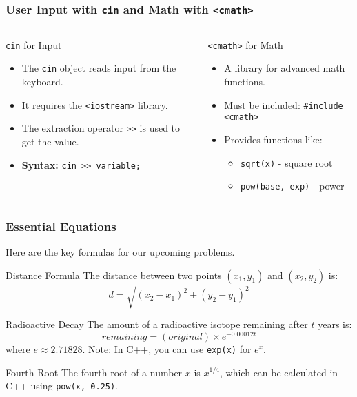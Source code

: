 \documentclass{beamer}
\begin{document}
\begin{frame}
\frametitle{User Input with \texttt{cin} and Math with \texttt{<cmath>}}
\begin{columns}[T]
    \begin{column}{0.5\textwidth}
        \begin{block}{\texttt{cin} for Input}
            \begin{itemize}
                \item The \texttt{cin} object reads input from the keyboard.
                \item It requires the \texttt{<iostream>} library.
                \item The extraction operator \texttt{>>} is used to get the value.
                \item \textbf{Syntax:} \texttt{cin >> variable;}
            \end{itemize}
        \end{block}
    \end{column}
    \begin{column}{0.5\textwidth}
        \begin{block}{\texttt{<cmath>} for Math}
            \begin{itemize}
                \item A library for advanced math functions.
                \item Must be included: \texttt{\#include <cmath>}
                \item Provides functions like:
                \begin{itemize}
                    \item \texttt{sqrt(x)} - square root
                    \item \texttt{pow(base, exp)} - power
                \end{itemize}
            \end{itemize}
        \end{block}
    \end{column}
\end{columns}
\end{frame}

\begin{frame}
\frametitle{Essential Equations}
Here are the key formulas for our upcoming problems.

\begin{block}{Distance Formula}
The distance between two points $(x_1, y_1)$ and $(x_2, y_2)$ is:
$$ d = \sqrt{(x_2 - x_1)^2 + (y_2 - y_1)^2} $$
\end{block}

\begin{block}{Radioactive Decay}
The amount of a radioactive isotope remaining after $t$ years is:
$$ remaining = (original) \times e^{-0.00012t} $$
where $e \approx 2.71828$. Note: In C++, you can use \texttt{exp(x)} for $e^x$.
\end{block}

\begin{block}{Fourth Root}
The fourth root of a number $x$ is $x^{1/4}$, which can be calculated in C++ using \texttt{pow(x, 0.25)}.
\end{block}
\end{frame}
\end{document}
